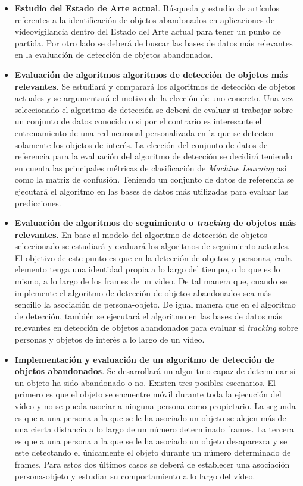 \begin{itemize}
    \item \textbf{Estudio del Estado de Arte actual}. Búsqueda y estudio de artículos referentes a la identificación de objetos abandonados en aplicaciones de videovigilancia dentro del Estado del Arte actual para tener un punto de partida. Por otro lado se deberá de buscar las bases de datos más relevantes en la evaluación de detección de objetos abandonados.
    \item \textbf{Evaluación de algoritmos algoritmos de detección de objetos más relevantes}. Se estudiará y comparará los algoritmos de detección de objetos actuales y se argumentará el motivo de la elección de uno concreto. Una vez seleccionado el algoritmo de detección se deberá de evaluar si trabajar sobre un conjunto de datos conocido o si por el contrario es interesante el entrenamiento de una red neuronal personalizada en la que se detecten solamente los objetos de interés. La elección del conjunto de datos de referencia para la evaluación del algoritmo de detección se decidirá teniendo en cuenta las principales métricas de clasificación de \textit{Machine Learning} así como la matriz de confusión. Teniendo un conjunto de datos de referencia se ejecutará el algoritmo en las bases de datos más utilizadas para evaluar las predicciones.
    \item \textbf{Evaluación de algoritmos de seguimiento o \textit{tracking} de objetos más relevantes}. En base al modelo del algoritmo de detección de objetos seleccionado se estudiará y evaluará los algoritmos de seguimiento actuales. El objetivo de este punto es que en la detección de objetos y personas, cada elemento tenga una identidad propia a lo largo del tiempo, o lo que es lo mismo, a lo largo de los frames de un video. De tal manera que, cuando se implemente el algoritmo de detección de objetos abandonados sea más sencillo la asociación de persona-objeto. De igual manera que en el algoritmo de detección, también se ejecutará el algoritmo en las bases de datos más relevantes en detección de objetos abandonados para evaluar si \textit{tracking} sobre personas y objetos de interés a lo largo de un vídeo.
    \item \textbf{Implementación y evaluación de un algoritmo de detección de objetos abandonados}. Se desarrollará un algoritmo capaz de determinar si un objeto ha sido abandonado o no. Existen tres posibles escenarios. El primero es que el objeto se encuentre móvil durante toda la ejecución del vídeo y no se pueda asociar a ninguna persona como propietario. La segunda es que a una persona a la que se le ha asociado un objeto se alejen más de una cierta distancia a lo largo de un número determinado frames. La tercera es que a una persona a la que se le ha asociado un objeto desaparezca y se este detectando el únicamente el objeto durante un número determinado de frames. Para estos dos últimos casos se deberá de establecer una asociación persona-objeto y estudiar su comportamiento a lo largo del vídeo.
\end{itemize}

